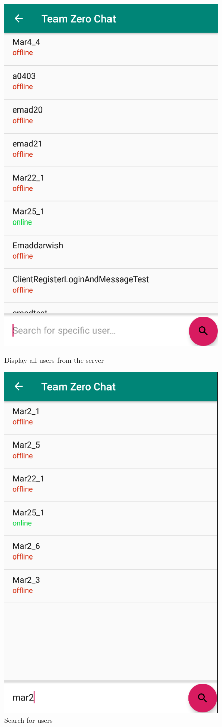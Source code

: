 \begin{figure}[H]
\centering
\begin{minipage}{.5\textwidth}
  \centering
  \includegraphics[width=.6\linewidth]{images/NewChatAllUsers.png}
  \caption{Display all users from the server}
  \label{newChatDisplayAllUsers}
\end{minipage}%
\begin{minipage}{.5\textwidth}
  \centering
  \includegraphics[width=.6\linewidth]{images/NewChatSelectUsers.png}
  \caption{Search for users}
  \label{newChatDisplaySelectUsers}
\end{minipage}
\end{figure}

